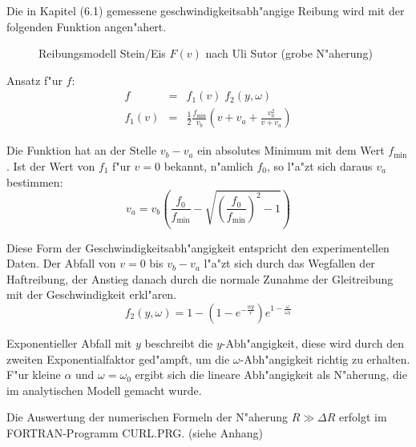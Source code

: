 \documentclass[a4paper]{report}
\begin{document}
Die in Kapitel (6.1) gemessene geschwindigkeitsabh"angige Reibung wird mit der
folgenden Funktion angen"ahert.

\begin{figure}[htb]
\begin{center}%

\end{center}
\caption{Reibungsmodell Stein/Eis $ F(v) $ nach Uli Sutor (grobe N"aherung)}
\end{figure}

Ansatz f"ur $ f $:
%
\begin{eqnarray}
f      &=& f_1(v)\;f_2(y,\omega)       \\
f_1(v) &=& \frac{1}{2} \frac{ f_\textrm{min} }{ v_b } \left(
	   v + v_a + \frac{ v_b^2 }{v + v_a} \right)
\end{eqnarray}

Die Funktion hat an der Stelle $ v_b - v_a $ ein absolutes Minimum mit
dem Wert $ f_\textrm{min} $. Ist der Wert von $ f_1 $ f"ur $ v = 0 $ bekannt,
n"amlich $ f_0 $, so l"a"zt sich daraus $ v_a $ bestimmen:
%
\begin{equation}
v_a =  v_b  \left( \frac{ f_0 }{ f_\textrm{min} } -
	\sqrt{\left( \frac{ f_0 }{ f_\textrm{min} } \right)^2 - 1} \right)
\end{equation}

Diese Form der Geschwindigkeitsabh"angigkeit entspricht den experimentellen
Daten. Der Abfall von $ v=0 $ bis $ v_b - v_a $ l"a"zt sich durch das
Wegfallen der Haftreibung, der Anstieg danach durch die normale Zunahme der
Gleitreibung mit der Geschwindigkeit erkl"aren.
%
\begin{equation}
f_2(y,\omega) = 1 - \left( 1 - e^{ -\frac{\alpha y}{r}} \right)
			       e^{1-\frac{\omega}{\omega_0}}
\end{equation}

Exponentieller Abfall mit $ y $ beschreibt die $ y $-Abh"angigkeit, diese wird
durch den zweiten Exponentialfaktor ged"ampft, um die $ \omega $-Abh"angigkeit
richtig zu erhalten. F"ur kleine $ \alpha $ und $ \omega = \omega_0 $ ergibt
sich die lineare Abh"angigkeit als N"aherung, die im analytischen Modell
gemacht wurde.

Die Auswertung der numerischen Formeln der N"aherung $ R \gg \Delta R $ erfolgt
im FORTRAN-Programm CURL.PRG. (siehe Anhang)
\end{document}
